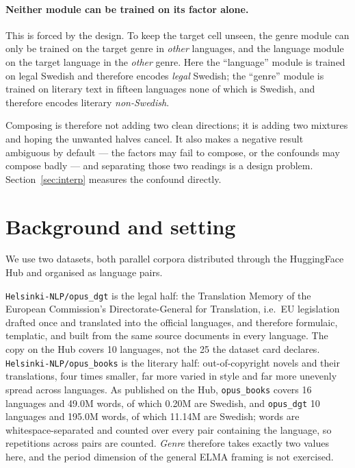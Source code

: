 \documentclass[10pt,twocolumn,a4paper]{article}
\newcommand{\tec}[1]{{\small\texttt{#1}}}
\begin{document}
\paragraph{Neither module can be trained on its factor alone.}
This is forced by the design. To keep the target cell unseen, the genre module can
only be trained on the target genre in \emph{other} languages, and the language
module on the target language in the \emph{other} genre.
Here the ``language'' module is
trained on legal Swedish and therefore encodes \emph{legal} Swedish; the
``genre'' module is trained on literary text in fifteen languages none of which
is Swedish, and therefore encodes literary \emph{non-Swedish}.

Composing is therefore not adding two clean directions; it is
adding two mixtures and hoping the unwanted halves cancel. It also makes a
negative result ambiguous by default --- the factors may fail to compose, or the
confounds may compose badly --- and separating those two readings is a design
problem. Section~\ref{sec:interp} measures the confound directly.

\section{Background and setting}

\label{sec:why}

We use two datasets, both parallel corpora distributed through the HuggingFace
Hub and organised as language pairs.

\tec{Helsinki-NLP/opus\_dgt} is the legal half: the Translation Memory of the
European Commission's Directorate-General for Translation, i.e.\ EU legislation
drafted once and translated into the official languages, and therefore
formulaic, templatic, and built from the same source documents in every
language. The copy on the Hub covers 10 languages, not the 25 the dataset card
declares. \tec{Helsinki-NLP/opus\_books} is the literary half: out-of-copyright
novels and their translations, four times smaller, far more varied in style and
far more unevenly spread across languages. As published on the Hub, \tec{opus\_books} covers 16 languages and 49.0M words,
of which 0.20M are Swedish, and \tec{opus\_dgt} 10 languages and 195.0M words, of
which 11.14M are Swedish; words are whitespace-separated and counted over every
pair containing the language, so repetitions across pairs are counted.
\emph{Genre} therefore takes exactly two values here, and the period dimension of
the general ELMA framing is not exercised.
\end{document}
